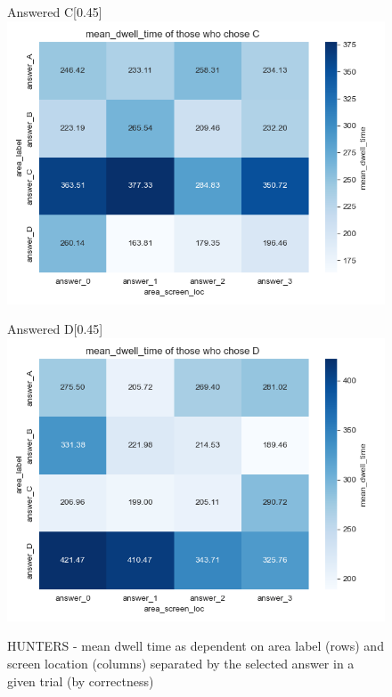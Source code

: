 \documentclass[manuscript,review,anonymous]{acmart}
\begin{document}
\begin{figure}[htbp]
          \medskip
        
          \begin{subcaptionbox}{Answered C\label{fig:C5}}[0.45\textwidth]
            {\centering\includegraphics[width=\linewidth]{plots/matrix_plots/matrix_mean_dwell_time_C_hunters.png}}
          \end{subcaptionbox}
          \hfill
          \begin{subcaptionbox}{Answered D\label{fig:D5}}[0.45\textwidth]
            {\centering\includegraphics[width=\linewidth]{plots/matrix_plots/matrix_mean_dwell_time_D_hunters.png}}
          \end{subcaptionbox}
          
          \caption{HUNTERS - mean dwell time as dependent on area label (rows) and screen location (columns) separated by the selected answer in a given trial (by correctness)}
          \label{fig:hun_dwell}
        \end{figure}
\end{document}
